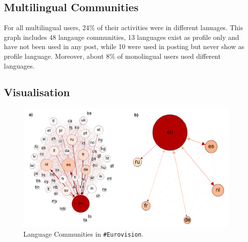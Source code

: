 \documentclass{llncs}
\begin{document}
\subsection{Multilingual Communities}
For all multilingual users, 24\% of their activities were in 
different lanuages. This graph includes 48 langauge communities, 13 languages exist as profile only and
have not been used in any post, while 10 were used in posting but never show as profile
language. Moreover, about 8\% of monolingual users used different languages.


\subsection{Visualisation}

\begin{figure}[htb]
\centering
\includegraphics[width=\textwidth]{images/communitiesgraphs.png}
\caption{Language Communities in {\texttt{\#Eurovision}}.}
\label{fig:communitiesgraphs}

\end{figure}


\end{document}
